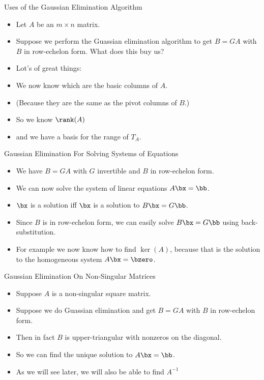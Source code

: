 \documentclass{beamer}
\begin{document}
\begin{frame}{Uses of the Gaussian Elimination Algorithm}

\begin{itemize}
\item Let $A$ be an $m\times n$ matrix.
\item Suppose we perform the Guassian elimination algorithm to get $B=GA$
with $B$ in row-echelon form. What does this buy us?
\item Lot's of great things:
\item We now know which are the basic columns of $A$.
\item (Because they are the same as the pivot columns of $B$.)
\item So we know $\rank(A)$
\item and we have a basis for the range of $T_A$.
\end{itemize}
\end{frame}


\begin{frame}{Gaussian Elimination For Solving Systems of Equations}

\begin{itemize}
\item We have $B=GA$ with $G$ invertible and $B$ in row-echelon form.
\item We can now solve the system of linear equations $A\bx=\bb$.
\item $\bx$ is a solution iff $\bx$ is a solution to $B\bx=G\bb$.
\item Since $B$ is in row-echelon form, we can easily solve $B\bx=G\bb$ using
back-substitution.
\item For example we now know how to find $\ker(A)$, because that is the solution to
the homogeneous system $A\bx=\bzero$.
\end{itemize}
\end{frame}


\begin{frame}{Gaussian Elimination On Non-Singular Matrices}

\begin{itemize}
\item Suppose $A$ is a non-singular square matrix.
\item Suppose we do Guassian elimination and get $B=G A$ with $B$ in
row-echelon form.
\item Then in fact $B$ is upper-triangular with nonzeros on the diagonal.
\item So we can find the unique solution to $A\bx=\bb$.
\item As we will see later, we will also be able to find $A^{-1}$
\end{itemize}
\end{frame}
\end{document}
